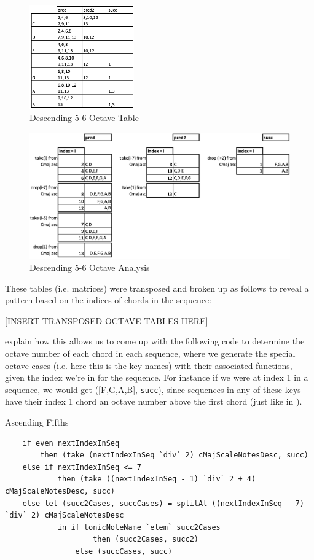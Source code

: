 \documentclass{report}
\begin{document}
\begin{figure}[h!]
\centering
\includegraphics[width=0.4\textwidth]{images/desc56_octave_grid}
  \caption{Descending 5-6 Octave Table}
\end{figure}

\begin{figure}[h!]
\centering
\includegraphics[width=\textwidth]{images/desc56_octave_analysis}
  \caption{Descending 5-6 Octave Analysis}
\end{figure}

These tables (i.e. matrices) were transposed and broken up as follows to reveal a pattern based on the indices of chords in the sequence:

[INSERT TRANSPOSED OCTAVE TABLES HERE]

explain how this allows us to come up with the following code to determine the octave number of each chord in each sequence, where we generate the special octave cases (i.e. here this is the key names) with their associated functions, given the index we're in for the sequence. For instance if we were at index 1 in a sequence, we would get ([F,G,A,B], \verb.succ.), since sequences in any of these keys have their index 1 chord an octave number above the first chord (just like in ).

Ascending Fifths
\begin{verbatim}
    if even nextIndexInSeq 
        then (take (nextIndexInSeq `div` 2) cMajScaleNotesDesc, succ)
    else if nextIndexInSeq <= 7
            then (take ((nextIndexInSeq - 1) `div` 2 + 4) cMajScaleNotesDesc, succ)
    else let (succ2Cases, succCases) = splitAt ((nextIndexInSeq - 7) `div` 2) cMajScaleNotesDesc
            in if tonicNoteName `elem` succ2Cases 
                    then (succ2Cases, succ2) 
                else (succCases, succ)
\end{verbatim}
\end{document}
